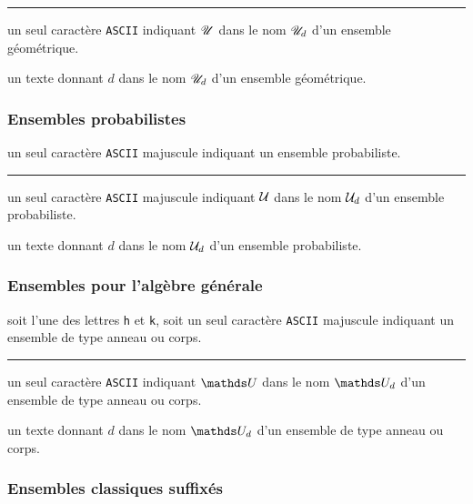 \documentclass[12pt,a4paper]{book}
\theoremstyle{definition}
\newcommand\separation{
	\medskip
	\hfill\rule{0.5\textwidth}{0.75pt}\hfill
	\medskip
}
\newcommand\ascii{\texttt{ASCII}}
\begin{document}
{{\separation



 un seul caractère \ascii{} indiquant $\setgeo{U}$ dans le nom $\setgeo*{U}{d}$ d'un ensemble géométrique.

 un texte donnant $d$ dans le nom $\setgeo*{U}{d}$ d'un ensemble géométrique.




\subsubsection{Ensembles probabilistes}




\IDarg{} un seul caractère \ascii{} majuscule indiquant un ensemble probabiliste.


\separation



 un seul caractère \ascii{} majuscule indiquant $\setproba{U}$ dans le nom $\setproba*{U}{d}$ d'un ensemble probabiliste.

 un texte donnant $d$ dans le nom $\setproba*{U}{d}$ d'un ensemble probabiliste.




\subsubsection{Ensembles pour l'algèbre générale}




\IDarg{} soit l'une des lettres  \texttt{h} et \texttt{k}, soit un seul caractère \ascii{} majuscule indiquant un ensemble de type anneau ou corps.


\separation



 un seul caractère \ascii{} indiquant $\setalge{U}$ dans le nom $\setalge*{U}{d}$ d'un ensemble de type anneau ou corps.

 un texte donnant $d$ dans le nom $\setalge*{U}{d}$ d'un ensemble de type anneau ou corps.




\subsubsection{Ensembles classiques suffixés}



}}
\end{document}
